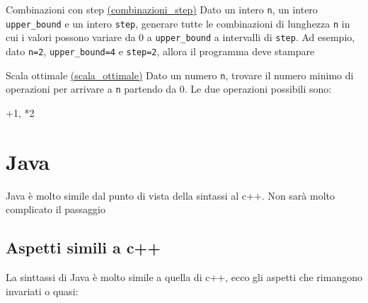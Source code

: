 \begin{esercizio}{Combinazioni con step \href{run:./files/algoritmi/combinazioni_step/}{(combinazioni\_step)}}
	Dato un intero \verb|n|, un intero \verb|upper_bound| e un intero \verb|step|, generare tutte le combinazioni di lunghezza \verb|n| in cui i valori possono variare da $ 0 $ a \verb|upper_bound| a intervalli di \verb|step|. Ad esempio, dato \verb|n=2|, \verb|upper_bound=4| e \verb|step=2|, allora il programma deve stampare
	\begin{center}
		\ttfamily [0,0] [2,0] [0,2] [2,2] [4,0] [0,4] [4,2] [2,4] [4,4]
	\end{center}
\end{esercizio}

\begin{esercizio}{Scala ottimale \href{run:./files/algoritmi/scala_ottimale/}{(scala\_ottimale)}}
	Dato un numero \verb|n|, trovare il numero minimo di operazioni per arrivare a \verb|n| partendo da 0. Le due operazioni possibili sono:
	\begin{center}
		\ttfamily   +1, *2
	\end{center}
\end{esercizio}
\section{Java}
Java è molto simile dal punto di vista della sintassi al c++. Non sarà molto complicato il passaggio
\subsection{Aspetti simili a c++}
La sinttassi di Java è molto simile a quella di c++, ecco gli aspetti che rimangono invariati o quasi:
